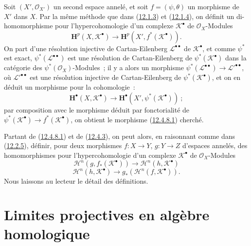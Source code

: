 \begin{env}[12.4.8]
\label{0.12.4.8-fr}
Soit $(X',\mathcal O_{X'})$ un second espace annelé, et soit
$f=(\psi,\theta)$ un morphisme de $X'$ dans $X$. Par la même méthode que
dans (\hyperref[0.12.1.3-fr]{12.1.3}) et
(\hyperref[0.12.1.4-fr]{12.1.4}), on définit un di-homomorphisme pour
l'hypercohomologie d'un complexe $\mathcal K^\bullet$ de
$\mathcal O_X$-Modules
\begin{equation}
\label{0.12.4.8.1-fr}
\tag{12.4.8.1}
\mathbf H^p(X,\mathcal K^\bullet)
\longrightarrow\mathbf H^p(X',f^*(\mathcal K^\bullet)).
\end{equation}
On part d'une résolution injective de Cartan-Eilenberg
$\mathcal L^{\bullet\bullet}$ de $\mathcal K^\bullet$, et comme $\psi^*$
est exact, $\psi^*(\mathcal L^{\bullet\bullet})$ est une résolution de
Cartan-Eilenberg de $\psi^*(\mathcal K^\bullet)$ dans la catégorie des
$\psi^*(\mathcal O_X)$-Modules~; il y a alors un morphisme
$\psi^*(\mathcal L^{\bullet\bullet})\to
\mathcal L'^{\bullet\bullet}$, où $\mathcal L'^{\bullet\bullet}$ est une
résolution injective de Cartan-Eilenberg de
$\psi^*(\mathcal K^\bullet)$, et on en déduit un morphisme pour la
cohomologie~:
\[
\mathbf H^\bullet(X,\mathcal K^\bullet)
\longrightarrow\mathbf H^\bullet(X',\psi^*(\mathcal K^\bullet))~;
\]
par composition avec le morphisme déduit par fonctorialité de
$\psi^*(\mathcal K^\bullet)\to f^*(\mathcal K^\bullet)$, on obtient le
morphisme (\hyperref[0.12.4.8.1-fr]{12.4.8.1}) cherché.

Partant de (\hyperref[0.12.4.8.1-fr]{12.4.8.1}) et de
(\hyperref[0.12.4.3-fr]{12.4.3}), on peut alors, en raisonnant comme dans
(\hyperref[0.12.2.5-fr]{12.2.5}), définir, pour deux morphismes
$f:X\to Y$, $g:Y\to Z$ d'espaces annelés, des homomorphismes pour
l'hypercohomologie d'un complexe $\mathcal K^\bullet$ de
$\mathcal O_X$-Modules
\begin{equation}
\label{0.12.4.8.2-fr}
\tag{12.4.8.2}
\mathcal H^n(g,f_*(\mathcal K^\bullet))
\longrightarrow\mathcal H^n(h,\mathcal K^\bullet)
\end{equation}
\begin{equation}
\label{0.12.4.8.3-fr}
\tag{12.4.8.3}
\mathcal H^n(h,\mathcal K^\bullet)
\longrightarrow g_*(\mathcal H^n(f,\mathcal K^\bullet)).
\end{equation}
Nous laissons au lecteur le détail des définitions.
\end{env}

\section{Limites projectives en algèbre homologique}
\label{section:0.13-fr}

